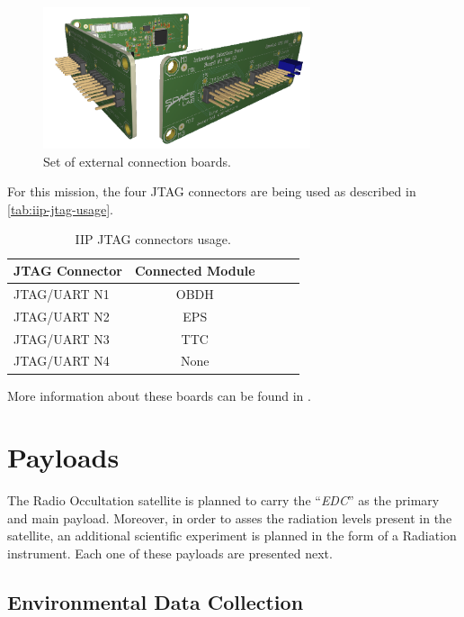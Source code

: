 \begin{figure}[!ht]
    \begin{center}
        \includegraphics[width=0.7\textwidth]{figures/iip_fullset}
        \caption{Set of external connection boards.}
        \label{fig:iip-boards}
    \end{center}
\end{figure}

For this mission, the four JTAG connectors are being used as described in \autoref{tab:iip-jtag-usage}.

\begin{table}[!h]
    \centering
    \begin{tabular}{lcccc}
        \toprule[1.5pt]
        \textbf{JTAG Connector} & \textbf{Connected Module} \\
        \midrule
        JTAG/UART N1 & OBDH \\
        JTAG/UART N2 & EPS \\
        JTAG/UART N3 & TTC \\
        JTAG/UART N4 & None \\
        \bottomrule[1.5pt]
    \end{tabular}
    \caption{IIP JTAG connectors usage.}
    \label{tab:iip-jtag-usage}
\end{table}

More information about these boards can be found in \cite{iip}.

\section{Payloads}

The Radio Occultation satellite is planned to carry the ``\textit{EDC}'' as the primary and main payload. Moreover, in order to asses the radiation levels present in the satellite, an additional scientific experiment is planned in the form of a Radiation instrument. Each one of these payloads are presented next.

\subsection{Environmental Data Collection}

